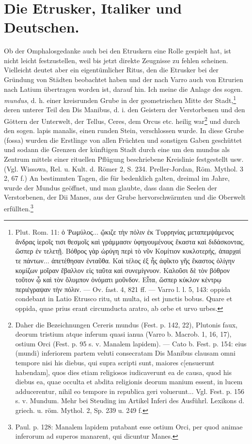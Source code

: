 \documentclass[a4paper, 11pt, oneside]{article}
\begin{document}
\section{Die Etrusker, Italiker und Deutschen.}
\paragraph{}
Ob der Omphalosgedanke auch bei den Etruskern eine Rolle gespielt hat, ist nicht leicht festzustellen, weil bis jetzt direkte Zeugnisse zu fehlen scheinen. Vielleicht deutet aber ein eigentümlicher Ritus, den die Etrusker bei der Gründung von Städten beobachtet haben und der nach Varro auch von Etrurien nach Latium übertragen worden ist, darauf hin. Ich meine die Anlage des sogen. \emph{mundus}, d. h. einer kreisrunden Grube in der geometrischen Mitte der Stadt,\footnote{Plut. Rom. 11: ὁ Ῥωμύλος... ᾤκιζε τὴν πόλιν ἐκ Τυρρηνίας μεταπεμψάμενος ἄνδρας ἱεροῖς τισι θεσμοῖς καὶ γράμμασιν ὑφηγουμένους ἕκαστα καὶ διδάσκοντας, ὥσπερ ἐν τελετῇ. Βόθρος γὰρ ὠρύγη περὶ τὸ νῦν Κομίτιον κυκλοτερής, ἀπαρχαί τε πάντων... ἀπετέθησαν ἐνταῦθα. Καὶ τέλος ἐξ ἧς ἀφῖκτο γῆς ἕκαστος ὀλίγην κομίζων μοῖραν ἔβαλλον εἰς ταῦτα καὶ συνεμίγνυον. Καλοῦσι δὲ τὸν βόθρον τοῦτον ᾧ καὶ τὸν ὄλυμπον ὀνόματι μοῦνδον. Εἶτα, ὥσπερ κύκλον κέντρῳ περιέγραψαν τὴν πόλιν. --- Ov. fast. 4, 821 ff. --- Varro l. l. 5, 143: oppida condebant in Latio Etrusco ritu, ut multa, id est junctis bobus. Quare et oppida, quae prius erant circumducta aratro, ab orbe et urvo urbes.} deren unterer Teil den Dis Manibus, d. i. den Geistern der Verstorbenen und den Göttern der Unterwelt, der Tellus, Ceres, dem Orcus etc. heilig war\footnote{Daher die Bezeichnungen Cereris mundus (Fest. p. 142, 22), Plutonis faux, deorum tristium atque inferum quasi ianua (Varro b. Macrob. 1, 16, 17), ostium Orci (Fest. p. 95 s. v. Manalem lapidem). --- Cato b. Fest. p. 154: eius (mundi) inferiorem partem veluti consecratam Dis Manibus clausam omni tempore nisi his diebus, qui supra scripti sunt, maiores c[ensuerunt habendam], quos dies etiam religiosos iudicaverunt ea de causa, quod his diebus ea, quae occulta et abdita religionis deorum manium essent, in lucem adducerentur, nihil eo tempore in republica geri voluerunt... Vgl. Fest. p. 156 s. v. Mundum. Mehr bei Steuding im Artikel Inferi des Ausführl. Lexikons d. griech. u. röm. Mythol. 2, Sp. 239 u. 249 f.} und durch den sogen. lapis manalis, einen runden Stein, verschlossen wurde. In diese Grube (fossa) wurden die Erstlinge von allen Früchten und sonstigen Gaben geschüttet und sodann die Grenzen der künftigen Stadt durch eine um den mundus als Zentrum mittels einer rituellen Pflügung beschriebene Kreislinie festgestellt usw. (Vgl. Wissowa, Rel. u. Kult. d. Römer 2, S. 234. Preller-Jordan, Röm. Mythol. 3 2, 67 f.) An bestimmten Tagen, die für bedenklich galten, dreimal im Jahre, wurde der Mundus geöffnet, und man glaubte, dass dann die Seelen der Verstorbenen, der Dii Manes, aus der Grube hervorschwärmten und die Oberwelt erfüllten.\footnote{Paul. p. 128: Manalem lapidem putabant esse ostium Orci, per quod animae inferorum ad superos manarent, qui dicuntur Manes.}
\end{document}
